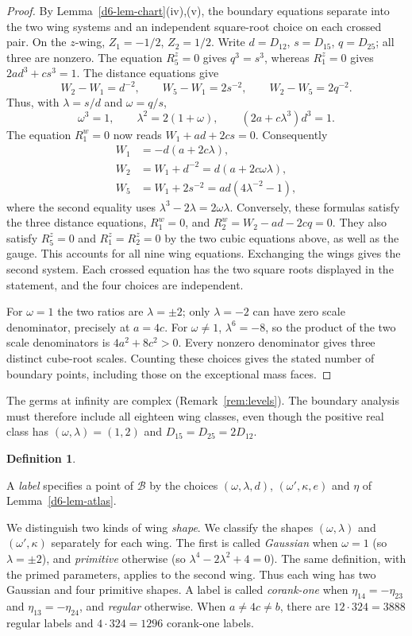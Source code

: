 \documentclass[11pt]{amsart}
\theoremstyle{definition}
\newtheorem{definition}[theorem]{Definition}
\theoremstyle{remark}
\begin{document}
{\begin{proof}
By Lemma~\ref{d6-lem-chart}(iv),(v), the boundary equations separate
into the two wing systems and an independent square-root choice on each
crossed pair. On the $z$-wing,
$Z_1=-1/2$, $Z_2=1/2$. Write
$d=D_{12}$, $s=D_{15}$, $q=D_{25}$; all three are nonzero.
The equation $R_5^z=0$ gives $q^3=s^3$, whereas $R_1^z=0$ gives
$2ad^3+cs^3=1$. The distance equations give
\[
W_2-W_1=d^{-2},\qquad W_5-W_1=2s^{-2},\qquad
W_2-W_5=2q^{-2}.
\]
Thus, with $\lambda=s/d$ and $\omega=q/s$,
\[
\omega^3=1,\qquad \lambda^2=2(1+\omega),\qquad
(2a+c\lambda^3)d^3=1.
\]
The equation $R_1^w=0$ now reads $W_1+ad+2cs=0$.
Consequently
\begin{align*}
W_1&=-d(a+2c\lambda),\\
W_2&=W_1+d^{-2}=d(a+2c\omega\lambda),\\
W_5&=W_1+2s^{-2}=ad(4\lambda^{-2}-1),
\end{align*}
where the second equality uses $\lambda^3-2\lambda=2\omega\lambda$.
Conversely, these formulas satisfy the three distance equations,
$R_1^w=0$, and
$R_2^w=W_2-ad-2cq=0$. They also satisfy $R_5^z=0$ and
$R_1^z=R_2^z=0$ by the two cubic equations above, as well as the gauge.
This accounts for all nine wing equations.  Exchanging the wings gives
the second system.  Each crossed equation has the two square roots
displayed in the statement, and the four choices are independent.

For $\omega=1$ the two ratios are $\lambda=\pm2$; only $\lambda=-2$
can have zero scale denominator, precisely at $a=4c$.
For $\omega\ne1$, $\lambda^6=-8$, so the product of the two scale
denominators is $4a^2+8c^2>0$. Every nonzero denominator gives three distinct
cube-root scales.  Counting these choices gives the stated number of
boundary points, including those on the exceptional mass faces.
\end{proof}

}{
The germs at infinity are complex (Remark~\ref{rem:levels}).  The boundary
analysis must therefore include all eighteen wing classes, even though the
positive real class has $(\omega,\lambda)=(1,2)$ and $D_{15}=D_{25}=2D_{12}$.
}

\begin{definition}\label{d6-def-labels}
{
A \emph{label} specifies a point of $\mathcal B$ by the choices
$(\omega,\lambda,d)$, $(\omega',\kappa,e)$ and $\eta$ of
Lemma~\ref{d6-lem-atlas}.

We distinguish two kinds of wing \emph{shape}.
We classify the shapes $(\omega,\lambda)$ and $(\omega',\kappa)$ separately for each wing.
The first is called \emph{Gaussian} when $\omega=1$ (so $\lambda=\pm2$), and \emph{primitive}
otherwise (so $\lambda^4-2\lambda^2+4=0$).  The same definition, with the primed
parameters, applies to the second wing.
Thus each wing has two Gaussian and four primitive shapes.
A label is called \emph{corank-one} when $\eta_{14}=-\eta_{23}$ and
$\eta_{13}=-\eta_{24}$, and \emph{regular} otherwise.
When $a\ne4c\ne b$, there are $12\cdot324=3888$ regular labels and
$4\cdot324=1296$ corank-one labels.
}
\end{definition}
\end{document}
